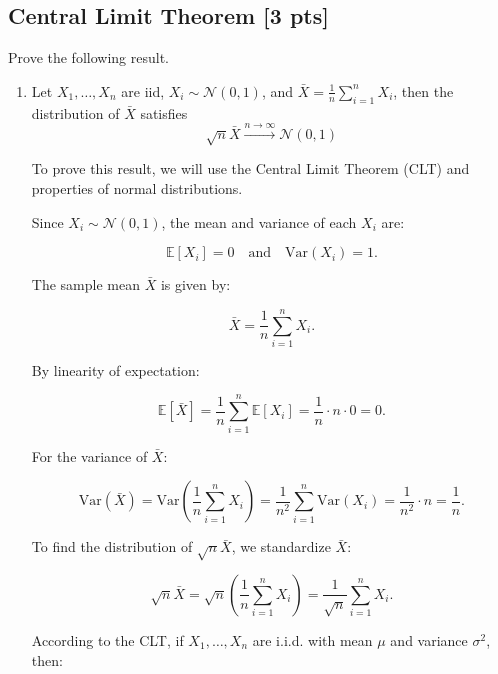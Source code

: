 \documentclass[letter]{article}
\theoremstyle{definition}
\newenvironment{soln}{
	\leavevmode\color{black}\ignorespaces
}{}
\begin{document}
	\subsection{Central Limit Theorem [3 pts]}
	Prove the following result.
	\begin{enumerate}
		\item Let $X_1,\dotsc,X_n$ are iid, $X_i\sim\mathcal{N}(0, 1)$, and $\bar{X} = \frac{1}{n}\sum_{i=1}^n X_i$, then the distribution of $\bar{X}$ satisfies 
		$$\sqrt{n}\bar{X}\overset{n\rightarrow\infty}{\longrightarrow}\mathcal{N}(0, 1)$$
		
		\begin{soln}
            To prove this result, we will use the Central Limit Theorem (CLT) and properties of normal distributions.
            
            
            
               Since \(X_i \sim \mathcal{N}(0, 1)\), the mean and variance of each \(X_i\) are:
            
               \[
               \mathbb{E}[X_i] = 0 \quad \text{and} \quad \text{Var}(X_i) = 1.
               \]
            
               The sample mean \(\bar{X}\) is given by:
            
               \[
               \bar{X} = \frac{1}{n} \sum_{i=1}^n X_i.
               \]
            
               By linearity of expectation:
            
               \[
               \mathbb{E}[\bar{X}] = \frac{1}{n} \sum_{i=1}^n \mathbb{E}[X_i] = \frac{1}{n} \cdot n \cdot 0 = 0.
               \]
            
               For the variance of \(\bar{X}\):
            
               \[
               \text{Var}(\bar{X}) = \text{Var}\left(\frac{1}{n} \sum_{i=1}^n X_i \right) = \frac{1}{n^2} \sum_{i=1}^n \text{Var}(X_i) = \frac{1}{n^2} \cdot n = \frac{1}{n}.
               \]
            
            
               To find the distribution of \(\sqrt{n}\bar{X}\), we standardize \(\bar{X}\):
            
               \[
               \sqrt{n} \bar{X} = \sqrt{n} \left(\frac{1}{n} \sum_{i=1}^n X_i \right) = \frac{1}{\sqrt{n}} \sum_{i=1}^n X_i.
               \]
            
               According to the CLT, if \(X_1, \dotsc, X_n\) are i.i.d. with mean \(\mu\) and variance \(\sigma^2\), then:
            

\end{soln}
\end{enumerate}
\end{document}
